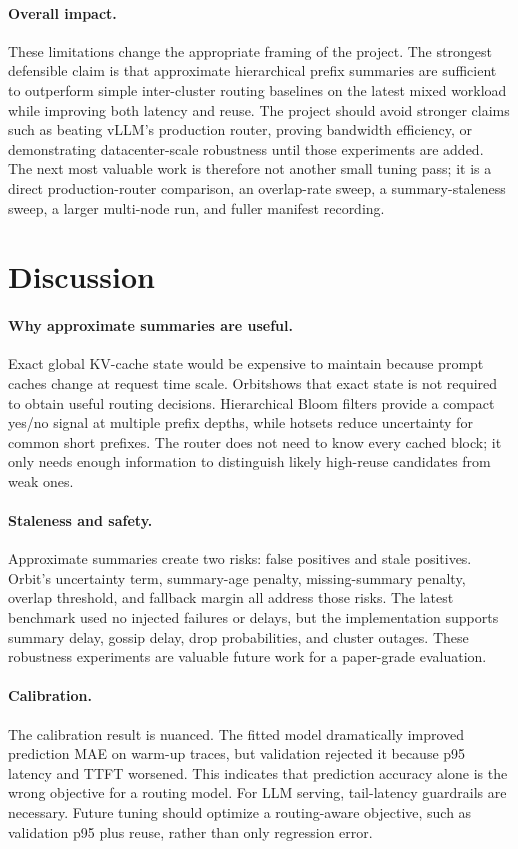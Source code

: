 \documentclass[10pt,twocolumn]{article}
\newcommand{\sys}{Orbit}
\begin{document}
\paragraph{Overall impact.}
These limitations change the appropriate framing of the project. The strongest defensible claim is that approximate hierarchical prefix summaries are sufficient to outperform simple inter-cluster routing baselines on the latest mixed workload while improving both latency and reuse. The project should avoid stronger claims such as beating vLLM's production router, proving bandwidth efficiency, or demonstrating datacenter-scale robustness until those experiments are added. The next most valuable work is therefore not another small tuning pass; it is a direct production-router comparison, an overlap-rate sweep, a summary-staleness sweep, a larger multi-node run, and fuller manifest recording.

\section{Discussion}

\paragraph{Why approximate summaries are useful.}
Exact global KV-cache state would be expensive to maintain because prompt caches change at request time scale. \sys shows that exact state is not required to obtain useful routing decisions. Hierarchical Bloom filters provide a compact yes/no signal at multiple prefix depths, while hotsets reduce uncertainty for common short prefixes. The router does not need to know every cached block; it only needs enough information to distinguish likely high-reuse candidates from weak ones.

\paragraph{Staleness and safety.}
Approximate summaries create two risks: false positives and stale positives. Orbit's uncertainty term, summary-age penalty, missing-summary penalty, overlap threshold, and fallback margin all address those risks. The latest benchmark used no injected failures or delays, but the implementation supports summary delay, gossip delay, drop probabilities, and cluster outages. These robustness experiments are valuable future work for a paper-grade evaluation.

\paragraph{Calibration.}
The calibration result is nuanced. The fitted model dramatically improved prediction MAE on warm-up traces, but validation rejected it because p95 latency and TTFT worsened. This indicates that prediction accuracy alone is the wrong objective for a routing model. For LLM serving, tail-latency guardrails are necessary. Future tuning should optimize a routing-aware objective, such as validation p95 plus reuse, rather than only regression error.
\end{document}
